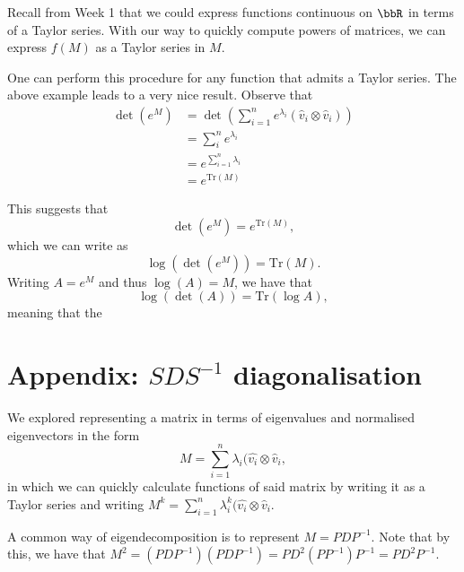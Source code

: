 \documentclass[a4paper, 12pt,oneside,openany]{book}
\begin{document}
Recall from Week 1 that we could express functions continuous on $\bbR$ in terms of a Taylor series. With our way to quickly compute powers of matrices, we can express $f(M)$ as a Taylor series in $M$.


One can perform this procedure for any function that admits a Taylor series. The above example leads to a very nice result. Observe that \begin{align*} \det(e^M) &= \det\left(\sum\limits_{i=1}^n e^{\lambda_i} (\hat{v}_i \otimes \hat{v}_i)\right) \\ &= \sum\limits_i^n  e^{\lambda_i} \\ &= e^{\sum\limits_{i=1}^n \lambda_i} \\ &= e^{\text{Tr}(M)} \end{align*}

This suggests that $$ \det(e^M) = e^{\text{Tr}(M)},$$ which we can write as $$\log(\det(e^M)) = \text{Tr}(M).$$ Writing $A = e^M$ and thus $\log(A) = M$, we have that $$\log(\det(A)) = \text{Tr}(\log A),$$ meaning that the 

\section{Appendix: $SDS^{-1}$ diagonalisation}

We explored representing a matrix in terms of eigenvalues and normalised eigenvectors in the form $$M = \sum\limits_{i=1}^n \lambda_i (\hat{v_i} \otimes \hat{v}_i,$$ in which we can quickly calculate functions of said matrix by writing it as a Taylor series and writing $M^k = \sum\limits_{i=1}^n \lambda_i^k (\hat{v_i} \otimes \hat{v}_i.$

A common way of eigendecomposition is to represent $M = PDP^{-1}$. Note that by this, we have that $M^2 = (PDP^{-1})(PDP^{-1})=PD^2(PP^{-1})P^{-1}=PD^2P^{-1}$. 
\end{document}
